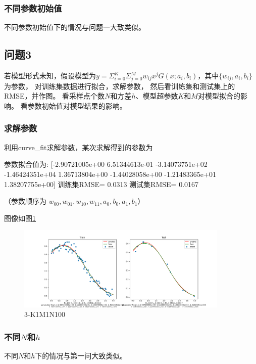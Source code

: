 \subsubsection{不同参数初始值}

不同参数初始值下的情况与问题一大致类似。

 \subsection{问题3}
 若模型形式未知，假设模型为$y=\Sigma^K_{i=0}\Sigma^M_{j=0} w_{ij}x^jG(x;a_i,b_i)$，其中$\{w_{ij}, a_i, b_i\}$ 为参数，
 对训练集数据进行拟合，求解参数，
 然后看训练集和测试集上的RMSE，并作图。
 看采样点个数$N$和方差$h$、模型超参数$K$和$M$对模型拟合的影响。
 看参数初始值对模型结果的影响。

 \subsubsection{求解参数}
 利用curve\_fit求解参数，某次求解得到的参数为
 \begin{python}
    参数拟合值为: [-2.90721005e+00  6.51344613e-01 -3.14073751e+02 -1.46424351e+04
  1.36713804e+00 -1.44028058e+00 -1.21483365e+01  1.38207755e+00]
训练集RMSE= 0.0313
测试集RMSE= 0.0167
 \end{python}
 （参数顺序为 $w_00, w_01, w_10, w_11, a_0, b_0, a_1, b_1$）

 图像如图\ref{fig:3-K1M1N100}
 \begin{figure}[H]
    \begin{center}
        \includegraphics[width=0.9\textwidth]{img/3-K1M1N100.png}
    \end{center}
   \caption[]{3-K1M1N100}
    \label{fig:3-K1M1N100}
\end{figure} 

\subsubsection{不同$N$和$h$}

不同$N$和$h$下的情况与第一问大致类似。

